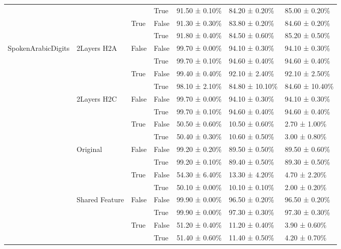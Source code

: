 \begin{tabular}{lllllll}
 &  &  & True & 91.50 ± 0.10\% & 84.20 ± 0.20\% & 85.00 ± 0.20\% \\
\cline{3-7}
 &  & \multirow[t]{2}{*}{True} & False & 91.30 ± 0.30\% & 83.80 ± 0.20\% & 84.60 ± 0.20\% \\
 &  &  & True & 91.80 ± 0.40\% & 84.50 ± 0.60\% & 85.20 ± 0.50\% \\
\cline{1-7} \cline{2-7} \cline{3-7}
\multirow[t]{20}{*}{SpokenArabicDigits} & \multirow[t]{4}{*}{2Layers H2A} & \multirow[t]{2}{*}{False} & False & 99.70 ± 0.00\% & 94.10 ± 0.30\% & 94.10 ± 0.30\% \\
 &  &  & True & 99.70 ± 0.10\% & 94.60 ± 0.40\% & 94.60 ± 0.40\% \\
\cline{3-7}
 &  & \multirow[t]{2}{*}{True} & False & 99.40 ± 0.40\% & 92.10 ± 2.40\% & 92.10 ± 2.50\% \\
 &  &  & True & 98.10 ± 2.10\% & 84.80 ± 10.10\% & 84.60 ± 10.40\% \\
\cline{2-7} \cline{3-7}
 & \multirow[t]{4}{*}{2Layers H2C} & \multirow[t]{2}{*}{False} & False & 99.70 ± 0.00\% & 94.10 ± 0.30\% & 94.10 ± 0.30\% \\
 &  &  & True & 99.70 ± 0.10\% & 94.60 ± 0.40\% & 94.60 ± 0.40\% \\
\cline{3-7}
 &  & \multirow[t]{2}{*}{True} & False & 50.50 ± 0.60\% & 10.50 ± 0.60\% & 2.70 ± 1.00\% \\
 &  &  & True & 50.40 ± 0.30\% & 10.60 ± 0.50\% & 3.00 ± 0.80\% \\
\cline{2-7} \cline{3-7}
 & \multirow[t]{4}{*}{Original} & \multirow[t]{2}{*}{False} & False & 99.20 ± 0.20\% & 89.50 ± 0.50\% & 89.50 ± 0.60\% \\
 &  &  & True & 99.20 ± 0.10\% & 89.40 ± 0.50\% & 89.30 ± 0.50\% \\
\cline{3-7}
 &  & \multirow[t]{2}{*}{True} & False & 54.30 ± 6.40\% & 13.30 ± 4.20\% & 4.70 ± 2.20\% \\
 &  &  & True & 50.10 ± 0.00\% & 10.10 ± 0.10\% & 2.00 ± 0.20\% \\
\cline{2-7} \cline{3-7}
 & \multirow[t]{4}{*}{Shared Feature} & \multirow[t]{2}{*}{False} & False & 99.90 ± 0.00\% & 96.50 ± 0.20\% & 96.50 ± 0.20\% \\
 &  &  & True & 99.90 ± 0.00\% & 97.30 ± 0.30\% & 97.30 ± 0.30\% \\
\cline{3-7}
 &  & \multirow[t]{2}{*}{True} & False & 51.20 ± 0.40\% & 11.20 ± 0.40\% & 3.90 ± 0.60\% \\
 &  &  & True & 51.40 ± 0.60\% & 11.40 ± 0.50\% & 4.20 ± 0.70\% \\

\end{tabular}
